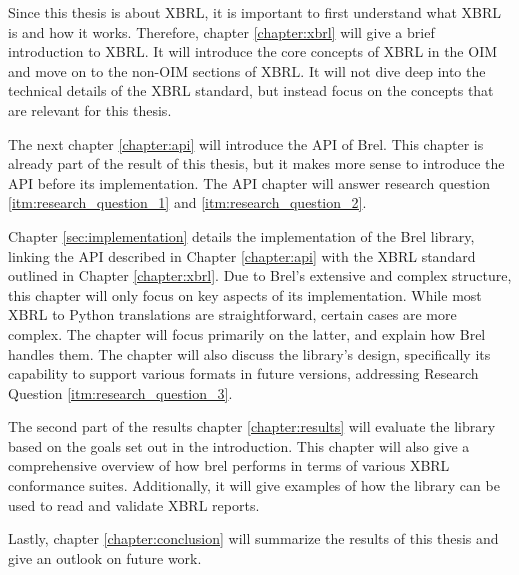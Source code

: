 Since this thesis is about XBRL, it is important to first understand what XBRL is and how it works.
Therefore, chapter \ref{chapter:xbrl} will give a brief introduction to XBRL. 
It will introduce the core concepts of XBRL in the OIM and move on to the non-OIM sections of XBRL.
It will not dive deep into the technical details of the XBRL standard, but instead focus on the concepts that are relevant for this thesis.

The next chapter \ref{chapter:api} will introduce the API of Brel.
This chapter is already part of the result of this thesis, but it makes more sense to introduce the API before its implementation.
The API chapter will answer research question \ref{itm:research_question_1} and \ref{itm:research_question_2}.

Chapter \ref{sec:implementation} details the implementation of the Brel library, 
linking the API described in Chapter \ref{chapter:api} with the XBRL standard outlined in Chapter \ref{chapter:xbrl}. 
Due to Brel's extensive and complex structure, this chapter will only focus on key aspects of its implementation. 
While most XBRL to Python translations are straightforward, certain cases are more complex. 
The chapter will focus primarily on the latter, and explain how Brel handles them. 
The chapter will also discuss the library's design, specifically its capability to support various formats in future versions, 
addressing Research Question \ref{itm:research_question_3}.


The second part of the results chapter \ref{chapter:results} will evaluate the library based on the goals set out in the introduction.
This chapter will also give a comprehensive overview of how brel performs in terms of various XBRL conformance suites.
Additionally, it will give examples of how the library can be used to read and validate XBRL reports.

Lastly, chapter \ref{chapter:conclusion} will summarize the results of this thesis and give an outlook on future work.
